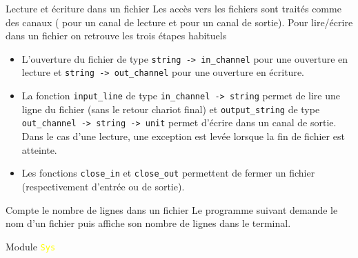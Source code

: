 \documentclass[10pt]{beamer}
\begin{document}
\begin{frame}[fragile]{\Ctitle}{\stitle}
    \begin{block}{Lecture et écriture dans un fichier}
        Les accès vers les fichiers sont traités comme des canaux ( pour un canal de lecture et  pour un canal de sortie). Pour lire/écrire dans un fichier on retrouve les trois étapes habituels
    \begin{itemize}
        \item<1-> L'ouverture du fichier de type {\tt string -> in\_channel} pour une ouverture en lecture et {\tt string -> out\_channel} pour une ouverture en écriture.
        \item<2-> La fonction {\tt input\_line} de type {\tt in\_channel -> string} permet de lire une ligne du fichier (sans le retour chariot final) et {\tt output\_string} de type {\tt out\_channel -> string -> unit} permet d'écrire dans un canal de sortie.
        {\small \textcolor{BrickRed}{\danger}\;} Dans le cas d'une lecture, une exception est levée lorsque la fin de fichier est atteinte.
        \item<3-> Les fonctions {\tt close\_in} et {\tt close\_out} permettent de fermer un fichier (respectivement d'entrée ou de sortie). 
    \end{itemize}
\end{block}
\end{frame}

\begin{frame}[fragile]{\Ctitle}{\stitle}
    \begin{exampleblock}{Compte le nombre de lignes dans un fichier}
    Le programme suivant demande le nom d'un fichier puis affiche son nombre de lignes dans le terminal.
    \end{exampleblock}
\end{frame}


\begin{frame}[fragile]{\Ctitle}{\stitle}
    \begin{block}{Module \textcolor{yellow}{\tt Sys}}
\end{block}
\end{frame}
\end{document}
